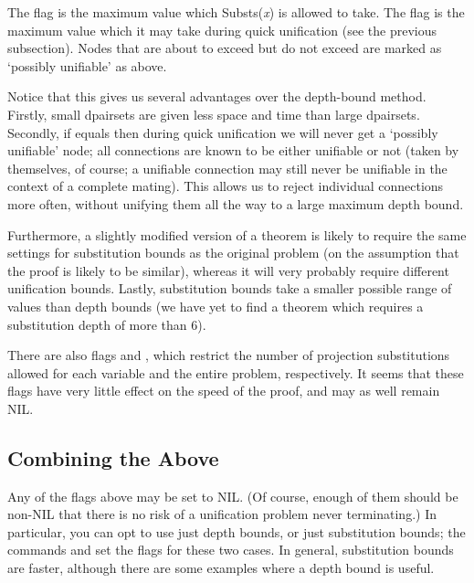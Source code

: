 The flag  is the maximum value which Substs({\it x}) is allowed to take.
The flag  is the maximum value which it may take during quick unification (see the
previous subsection). Nodes that are about to exceed  but do not exceed
 are marked as `possibly unifiable' as above.

Notice that this gives us several advantages over the depth-bound method. Firstly, small dpairsets are given less
space and time than large dpairsets. Secondly, if  equals 
then during quick unification we will never get a `possibly unifiable' node; all connections are known to be
either unifiable or not (taken by themselves, of course; a unifiable connection may still never be unifiable
in the context of a complete mating). This allows us to reject individual connections more often, without unifying them
all the way to a large maximum depth bound.

Furthermore, a slightly modified version of a theorem is likely to require the same settings for substitution bounds
as the original problem (on the assumption that the proof is likely to be similar), whereas it will very probably
require different unification bounds. Lastly, substitution bounds take a smaller possible range of values
than depth bounds (we have yet to find a {\TPS} theorem which requires a substitution depth of more than 6).

There are also flags  and , which restrict the number
of projection substitutions allowed for each variable and the entire problem, respectively. It seems that these
flags have very little effect on the speed of the proof, and may as well remain NIL.

\subsection{Combining the Above}

Any of the flags above may be set to NIL. (Of course, enough of them should be non-NIL that there is no risk of
a unification problem never terminating.) In particular, you can opt to use just depth bounds, or just substitution
bounds; the commands  and  set the flags for these two cases.
In general, substitution bounds are faster, although there are some examples where a depth bound is useful.

